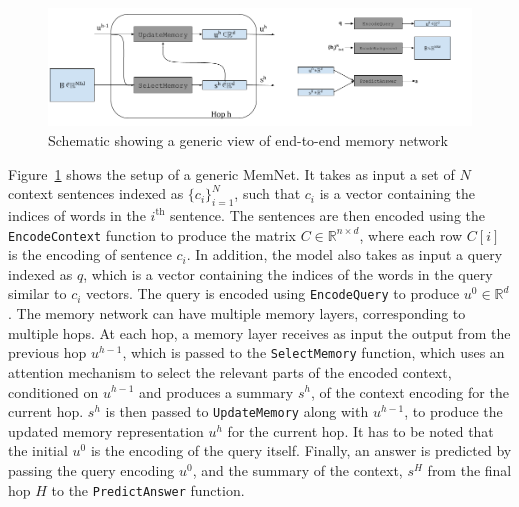 \begin{figure}
\begin{center}
  \includegraphics[width=6.5in]{figures/memory_network_generic.png}
  \caption{Schematic showing a generic view of end-to-end memory network}
  \label{fig:memnet}
  \end{center}
\end{figure}
Figure~\ref{fig:memnet} shows the setup of a generic MemNet. It takes as
input a set of $N$ context sentences indexed as $\{c_i\}_{i=1}^N$, such that
$c_i$ is a vector containing the indices of words in the $i^\text{th}$ sentence.
The sentences are then encoded using the \texttt{EncodeContext} function to
produce the matrix $C \in \mathbb{R}^{n \times d}$, where each row $C[i]$ is the
encoding of sentence $c_i$. In addition, the model also takes as input a query
indexed as $q$, which is a vector containing the indices of the words in the
query similar to $c_i$ vectors. The query is encoded using \texttt{EncodeQuery}
to produce $u^0 \in \mathbb{R}^d$. The memory network can have multiple memory
layers, corresponding to multiple hops. At each hop, a memory layer receives as
input the output from the previous hop $u^{h-1}$, which is passed to the
\texttt{SelectMemory} function, which uses an attention mechanism to select the
relevant parts of the encoded context, conditioned on $u^{h-1}$ and produces
a summary $s^h$, of the context encoding for the current hop. $s^h$ is then
passed to \texttt{UpdateMemory} along with $u^{h-1}$, to produce the updated
memory representation $u^h$ for the current hop. It has to be noted that the
initial $u^0$ is the encoding of the query itself. Finally, an answer is
predicted by passing the query encoding $u^0$, and the summary of the
context, $s^H$ from the final hop $H$ to the \texttt{PredictAnswer} function.

